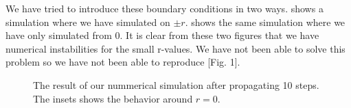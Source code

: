 We have tried to introduce these boundary conditions in two ways.  shows a
simulation where we have simulated on $\pm r$.  shows the same simulation
where we have only simulated from 0. It is clear from these two figures that we have numerical
instabilities for the small r-values. We have not been able to solve this problem so we have not
been able to reproduce \cite{prl-selffocus}[Fig. 1]. 
\begin{figure}[htb]
  \centering
  \hfill
  \caption{The result of our nummerical simulation after propagating 10 steps. The insets shows the
    behavior around $r=0$.}
  \label{fig:kerr-num}
\end{figure}



